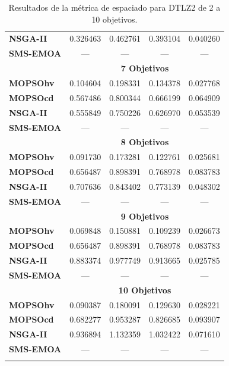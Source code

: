 \begin{longtable}{|l|cc|cc|}
	\textbf{NSGA-II} & 0.326463 & 0.462761 & 0.393104 & 0.040260 \\  
	\textbf{SMS-EMOA} & --- & --- & --- & --- \\
	\hline\hline
 & \multicolumn{4}{|c|}{\textbf{7 Objetivos}} \\ 
	\hline\hline
	\textbf{MOPSOhv} & 0.104604 & 0.198331 & 0.134378 & 0.027768   \\ 
	\textbf{MOPSOcd} & 0.567486 & 0.800344 & 0.666199 & 0.064909  \\ 
	\textbf{NSGA-II} & 0.555849 & 0.750226 & 0.626970 & 0.053539 \\  
	\textbf{SMS-EMOA} & --- & --- & --- & --- \\
	\hline\hline
 & \multicolumn{4}{|c|}{\textbf{8 Objetivos}} \\ 
	\hline\hline
	\textbf{MOPSOhv} & 0.091730 & 0.173281 & 0.122761 & 0.025681   \\ 
	\textbf{MOPSOcd} & 0.656487 & 0.898391 & 0.768978 & 0.083783 \\ 
	\textbf{NSGA-II} & 0.707636 & 0.843402 & 0.773139 & 0.048302 \\ 
	\textbf{SMS-EMOA} & --- & --- & --- & --- \\
	\hline\hline
 & \multicolumn{4}{|c|}{\textbf{9 Objetivos}} \\ 
	\hline\hline
	\textbf{MOPSOhv} &0.069848 & 0.150881 & 0.109239 & 0.026673   \\ 
	\textbf{MOPSOcd} & 0.656487 & 0.898391 & 0.768978 & 0.083783 \\ 
	\textbf{NSGA-II} &0.883374 & 0.977749 & 0.913665 & 0.025785 \\ 
	\textbf{SMS-EMOA} & --- & --- & --- & --- \\
	\hline\hline
 & \multicolumn{4}{|c|}{\textbf{10 Objetivos}} \\ 
	\hline\hline
	\textbf{MOPSOhv} &0.090387 & 0.180091 & 0.129630 & 0.028221    \\ 
	\textbf{MOPSOcd} &0.682277 & 0.953287 & 0.826685 & 0.093907  \\ 
	\textbf{NSGA-II} &0.936894 & 1.132359 & 1.032422 & 0.071610\\  
	\textbf{SMS-EMOA} & --- & --- & --- & --- \\
	\hline\hline
\caption{Resultados de la m\'etrica de espaciado para DTLZ2 de 2 a 10 objetivos.}
  \label{tab:dtlz2_es}
\end{longtable}
 

